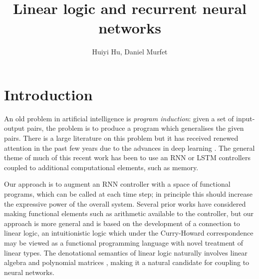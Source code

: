 \documentclass[english,letter paper,12pt,leqno]{article}
\theoremstyle{example}
\numberwithin{equation}{section}
\def\res{\operatorname{Res}}
\begin{document}
\def\Res{\res\!}
\newcommand{\ud}{\mathrm{d}}
\newcommand{\Ress}[1]{\res_{#1}\!}
\newcommand{\cat}[1]{\mathcal{#1}}
\newcommand{\lto}{\longrightarrow}
\newcommand{\xlto}[1]{\stackrel{#1}\lto}
\newcommand{\mf}[1]{\mathfrak{#1}}
\newcommand{\md}[1]{\mathscr{#1}}
\def\sus{\l}
\def\l{\,|\,}
\def\sgn{\textup{sgn}}

\title{Linear logic and recurrent neural networks}
\author{Huiyi Hu, Daniel Murfet}

\maketitle

\section{Introduction}

An old problem in artificial intelligence is \emph{program induction}: given a set of input-output pairs, the problem is to produce a program which generalises the given pairs. There is a large literature on this problem \cite{??,??} but it has received renewed attention in the past few years due to the advances in deep learning \cite{??,??,??}. The general theme of much of this recent work has been to use an RNN or LSTM controllers coupled to additional computational elements, such as memory. 

Our approach is to augment an RNN controller with a space of functional programs, which can be called at each time step; in principle this should increase the expressive power of the overall system. Several prior works \cite{??,??} have considered making functional elements such as arithmetic available to the controller, but our approach is more general and is based on the development of a connection to linear logic, an intuitionistic logic which under the Curry-Howard correspondence may be viewed as a functional programming language with novel treatment of linear types. The denotational semantics of linear logic naturally involves linear algebra and polynomial matrices \cite{??}, making it a natural candidate for coupling to neural networks.

\end{document}
